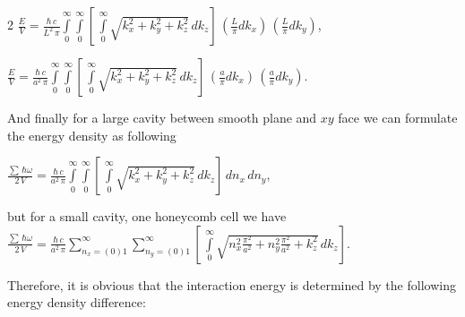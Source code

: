 \documentclass[twoside, 10pt]{article}
\begin{document}
\begin{multicols}{2}
\noindent
    \(\frac{E}{V} = \frac{\hbar\,c}{L^2\,\pi}\int\limits_{0}^{\infty}\int\limits_{0}^{\infty}\left[\,\int\limits_{0}^{\infty}\sqrt{k_x^2+k_y^2+k_z^2}\,dk_z\right]\,\left(\frac{L}{\pi}dk_x\right)\,\left(\frac{L}{\pi}dk_y\right)\),

\noindent
    \(\frac{E}{V} = \frac{\hbar\,c}{a^2\,\pi}\int\limits_{0}^{\infty}\int\limits_{0}^{\infty}\left[\,\int\limits_{0}^{\infty}\sqrt{k_x^2+k_y^2+k_z^2}\,dk_z\right]\,\left(\frac{a}{\pi}dk_x\right)\,\left(\frac{a}{\pi}dk_y\right)\).

And finally for a large cavity between smooth plane and \(xy\) face we can formulate the energy density as following

    \(\frac{\sum\,\hbar\omega}{2\,V} = \frac{\hbar\,c}{a^2\,\pi}\int\limits_{0}^{\infty}\int\limits_{0}^{\infty}\left[\,\int\limits_{0}^{\infty}\sqrt{k_x^2+k_y^2+k_z^2}\,dk_z\right]\,dn_x\,dn_y\),

but for a small cavity, one honeycomb cell we have
\noindent
    \(\frac{\sum\,\hbar\omega}{2\,V} = \frac{\hbar\,c}{a^2\,\pi}\sum\limits_{n_x=(0)1}^{\infty}\sum\limits_{n_y=(0)1}^{\infty}\left[\,\int\limits_{0}^{\infty}\sqrt{n_x^2\frac{\pi^2}{a^2}+n_y^2\frac{\pi^2}{a^2}+k_z^2}\,dk_z\right]\).




Therefore, it is obvious that the interaction energy is determined by the following energy density difference:
\end{multicols}
\noindent
\end{document}
